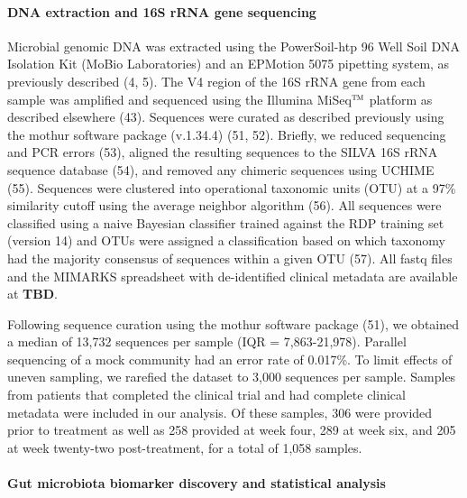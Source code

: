\documentclass[11pt,]{article}
\let\oldparagraph\paragraph
\renewcommand{\paragraph}[1]{\oldparagraph{#1}\mbox{}}
\begin{document}
\paragraph{DNA extraction and 16S rRNA gene
sequencing}\label{dna-extraction-and-16s-rrna-gene-sequencing}

Microbial genomic DNA was extracted using the PowerSoil-htp 96 Well Soil
DNA Isolation Kit (MoBio Laboratories) and an EPMotion 5075 pipetting
system, as previously described (4, 5). The V4 region of the 16S rRNA
gene from each sample was amplified and sequenced using the Illumina
MiSeq\(\text{\texttrademark}\) platform as described elsewhere (43).
Sequences were curated as described previously using the mothur software
package (v.1.34.4) (51, 52). Briefly, we reduced sequencing and PCR
errors (53), aligned the resulting sequences to the SILVA 16S rRNA
sequence database (54), and removed any chimeric sequences using UCHIME
(55). Sequences were clustered into operational taxonomic units (OTU) at
a 97\% similarity cutoff using the average neighbor algorithm (56). All
sequences were classified using a naive Bayesian classifier trained
against the RDP training set (version 14) and OTUs were assigned a
classification based on which taxonomy had the majority consensus of
sequences within a given OTU (57). All fastq files and the MIMARKS
spreadsheet with de-identified clinical metadata are available at
\textbf{TBD}.

Following sequence curation using the mothur software package (51), we
obtained a median of 13,732 sequences per sample (IQR = 7,863-21,978).
Parallel sequencing of a mock community had an error rate of 0.017\%. To
limit effects of uneven sampling, we rarefied the dataset to 3,000
sequences per sample. Samples from patients that completed the clinical
trial and had complete clinical metadata were included in our analysis.
Of these samples, 306 were provided prior to treatment as well as 258
provided at week four, 289 at week six, and 205 at week twenty-two
post-treatment, for a total of 1,058 samples.

\paragraph{Gut microbiota biomarker discovery and statistical
analysis}\label{gut-microbiota-biomarker-discovery-and-statistical-analysis}
\end{document}
